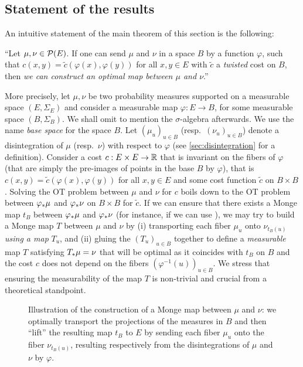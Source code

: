 \subsection{Statement of the results}
    An intuitive statement of the main theorem of this section is the following:
    \begin{center}
        ``Let $\mu,\nu\in \mathcal{P}(E)$. If one can send $\mu$ and $\nu$ in a space $B$ by a function $\varphi$, such that $c(x,y)=\tilde c(\varphi(x),\varphi(y))$ for all $x,y\in E$ with $\tilde c$ a \emph{twisted} cost on $B$,
        then \emph{we can construct an optimal map between $\mu$ and $\nu$}.''
    \end{center}
    More precisely, let $\mu,\nu$ be two probability measures supported on a measurable space $(E,\Sigma_E)$ and consider a measurable map $\varphi : E \to B$, for some measurable space $(B,\Sigma_B)$. We shall omit to mention the $\sigma$-algebra afterwards. We use the name \emph{base space} for the space $B$.
Let $(\mu_u)_{u \in B}$ (resp.~$(\nu_u)_{u \in B}$) denote a disintegration of $\mu$ (resp.~$\nu$) with respect to $\varphi$ (see \cref{sec:disintegration} for a definition).
Consider a cost $c : E \times E \to \mathbb{R}$ that is invariant on the fibers of $\varphi$ (that are simply the pre-images of points in the base $B$ by $\varphi$), that is $c(x,y) = \tilde{c}(\varphi(x), \varphi(y))$ for all $x,y \in E$ and some cost function $\tilde{c}$ on $B \times B$.
Solving the OT problem between $\mu$ and $\nu$ for $c$ boils down to the OT problem between $\varphi_* \mu$ and $\varphi_* \nu$ on $B \times B$ for $\tilde{c}$.
If we can ensure that there exists a Monge map $t_B$ between $\varphi_*\mu$ and $\varphi_*\nu$ (for instance, if we can use ),
we may try to build a Monge map $T$ between $\mu$ and $\nu$ by (i) transporting each fiber $\mu_u$ onto $\nu_{t_B(u)}$ \emph{using a map} $T_u$, and (ii) gluing the $(T_u)_{u \in B}$ together to define a \emph{measurable} map $T$ satisfying $T _* \mu = \nu$ that will be optimal as it coincides with $t_B$ on $B$ and the cost $c$ does not depend on the fibers $(\varphi^{-1}(u))_{u \in B}$.
We stress that ensuring the measurability of the map $T$ is non-trivial and crucial from a theoretical standpoint.
    \begin{figure}[!h]
        \centering
        
        \caption{Illustration of the construction of a Monge map between $\mu$ and $\nu$: we optimally transport the projections of the measures in $B$ and then ``lift'' the resulting map $t_B$ to $E$ by sending each fiber $\mu_u$ onto the fiber $\nu_{t_B(u)}$, resulting respectively from the disintegrations of $\mu$ and $\nu$ by $\varphi$.}
        \label{fig:visu-fibers}
    \end{figure}

